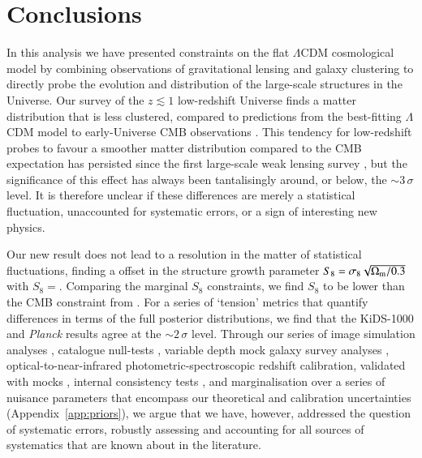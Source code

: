 \section{Conclusions}
\label{sec:conc}
In this analysis we have presented constraints on the flat $\Lambda$CDM cosmological model by combining observations of gravitational lensing and galaxy clustering to directly probe the evolution and distribution of the large-scale structures in the Universe.    Our survey of the $z \lesssim 1$ low-redshift Universe finds a matter distribution that is less clustered, compared to predictions from the best-fitting $\Lambda$CDM model to early-Universe CMB observations \citep{planck/etal:2018}.  This tendency for low-redshift probes to favour a smoother matter distribution compared to the CMB expectation has persisted since the first large-scale weak lensing survey \citep[CFHTLenS,][]{heymans/etal:2013}, but the significance of this effect has always been tantalisingly around, or below, the $\sim\! 3\,\sigma$ level.   It is therefore unclear if these differences are merely a statistical fluctuation, unaccounted for systematic errors, or a sign of interesting new physics.

Our new result does not lead to a resolution in the matter of statistical fluctuations, finding a \kpoff offset in the structure growth parameter $S_8 = \sigma_8 \sqrt{\Omega_{\rm m}/0.3}$ with $S_8=$\kSeightval.  Comparing the marginal $S_8$ constraints, we find $S_8$ to be \kpoffperc lower than the CMB constraint from \citet{planck/etal:2018}.   For a series of `tension' metrics that quantify differences in terms of the full posterior distributions, we find that the KiDS-1000 and {\it Planck} results agree at the $\sim\! 2\,\sigma$ level.   Through our series of image simulation analyses \citep{kannawadi/etal:2019}, catalogue null-tests \citep{giblin/etal:inprep}, variable depth mock galaxy survey analyses \citep{joachimi/etal:inprep}, optical-to-near-infrared photometric-spectroscopic redshift calibration, validated with mocks \citep{wright/etal:2020, vandenbusch/etal:2020,hildebrandt/etal:inprep}, internal consistency tests \citep[][Fig.~\ref{fig:cosmology-params-all} and Appendix~\ref{app:sensitivity}]{asgari/etal:inprep}, and marginalisation over a series of nuisance parameters that encompass our theoretical and calibration uncertainties (Appendix~\ref{app:priors}),  we argue that we have, however, addressed the question of \tttp systematic errors, robustly assessing and accounting for all sources of systematics that are known about in the literature.    

